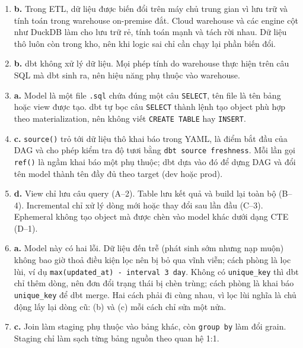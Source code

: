\documentclass[11pt,a4paper]{article}
\newcommand{\code}[1]{\texttt{#1}}
\begin{document}
\begin{enumerate}[label=\textbf{Câu \arabic*.},leftmargin=*,itemsep=6pt]

  \item \textbf{b.} Trong ETL, dữ liệu được biến đổi trên máy chủ trung gian vì lưu
  trữ và tính toán trong warehouse on-premise đắt. Cloud warehouse và các engine cột
  như DuckDB làm cho lưu trữ rẻ, tính toán mạnh và tách rời nhau. Dữ liệu thô luôn còn
  trong kho, nên khi logic sai chỉ cần chạy lại phần biến đổi.

  \item \textbf{b.} dbt không xử lý dữ liệu. Mọi phép tính do warehouse thực hiện trên
  câu SQL mà dbt sinh ra, nên hiệu năng phụ thuộc vào warehouse.

  \item \textbf{a.} Model là một file \code{.sql} chứa đúng một câu \code{SELECT}, tên
  file là tên bảng hoặc view được tạo. dbt tự bọc câu \code{SELECT} thành lệnh tạo
  object phù hợp theo materialization, nên không viết \code{CREATE TABLE} hay
  \code{INSERT}.

  \item \textbf{c.} \code{source()} trỏ tới dữ liệu thô khai báo trong YAML, là điểm
  bắt đầu của DAG và cho phép kiểm tra độ tươi bằng \code{dbt source freshness}. Mỗi lần
  gọi \code{ref()} là ngầm khai báo một phụ thuộc; dbt dựa vào đó để dựng DAG và đổi
  tên model thành tên đầy đủ theo target (dev hoặc prod).

  \item \textbf{d.} View chỉ lưu câu query (A--2). Table lưu kết quả và build lại toàn
  bộ (B--4). Incremental chỉ xử lý dòng mới hoặc thay đổi sau lần đầu (C--3). Ephemeral
  không tạo object mà được chèn vào model khác dưới dạng CTE (D--1).

  \item \textbf{a.} Model này có hai lỗi. Dữ liệu đến trễ (phát sinh sớm nhưng nạp muộn)
  không bao giờ thoả điều kiện lọc nên bị bỏ qua vĩnh viễn; cách phòng là lọc lùi, ví dụ
  \code{max(updated\_at) - interval 3 day}. Không có \code{unique\_key} thì dbt chỉ thêm
  dòng, nên đơn đổi trạng thái bị chèn trùng; cách phòng là khai báo \code{unique\_key}
  để dbt merge. Hai cách phải đi cùng nhau, vì lọc lùi nghĩa là chủ động lấy lại dòng
  cũ: (b) và (c) mỗi cách chỉ sửa một nửa.

  \item \textbf{c.} Join làm staging phụ thuộc vào bảng khác, còn \code{group by} làm
  đổi grain. Staging chỉ làm sạch từng bảng nguồn theo quan hệ 1:1.


\end{enumerate}
\end{document}
